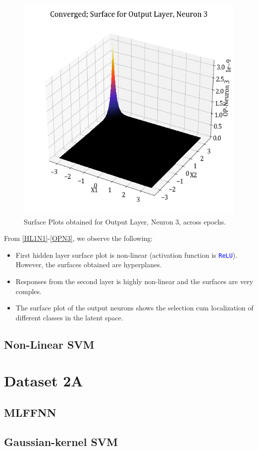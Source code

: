 \documentclass[11pt,a4paper]{article}
\newcommand{\noi}{\noindent}
\def\colortt#1{\textcolor{blue}{\texttt{#1}}}
\begin{document}
\begin{figure}[H]
    \includegraphics[scale=0.4]{images/1B_MLFFNN_conv_OP_N3.png}
    \caption{Surface Plots obtained for Output Layer, Neuron 3, across epochs.}
    \label{OPN3}
\end{figure}

\noi
From \autoref{HL1N1}-\autoref{OPN3}, we observe the following:
\begin{itemize}
    \itemsep0em 
    \item First hidden layer surface plot is non-linear (activation function is \colortt{ReLU}). However, the surfaces obtained are hyperplanes.
    \item Responses from the second layer is highly non-linear and the surfaces are very comples.
    \item The surface plot of the output neurons shows the selection cum localization of different classes in the latent space.
\end{itemize}

\subsection{Non-Linear SVM}

\break
\section{Dataset 2A}
\subsection{MLFFNN}
\subsection{Gaussian-kernel SVM}
\end{document}
